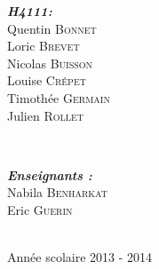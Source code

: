 \documentclass[a4paper]{report}
\newcommand{\theAuteur}{H4111}
\begin{document}
\begin{titlepage}
\begin{minipage}{0.4\textwidth}
\begin{flushleft} \large
\textbf{\emph{\theAuteur :}}\\
Quentin \textsc{Bonnet}\\
Loric \textsc{Brevet}\\
Nicolas \textsc{Buisson}\\
Louise \textsc{Crépet}\\
Timothée \textsc{Germain}\\
Julien \textsc{Rollet}%
\end{flushleft}
\end{minipage}
~
\begin{minipage}{0.4\textwidth}
\begin{flushright} \large
\textbf{\emph{Enseignants :}} \\
Nabila \textsc{Benharkat}\\
Eric \textsc{Guerin}%
\end{flushright}
\end{minipage}\\[4cm]



{\large Année scolaire 2013 - 2014}\\[3cm] %


 

\vfill %

\end{titlepage}

\clearpage
\tableofcontents
\clearpage





\end{document}
